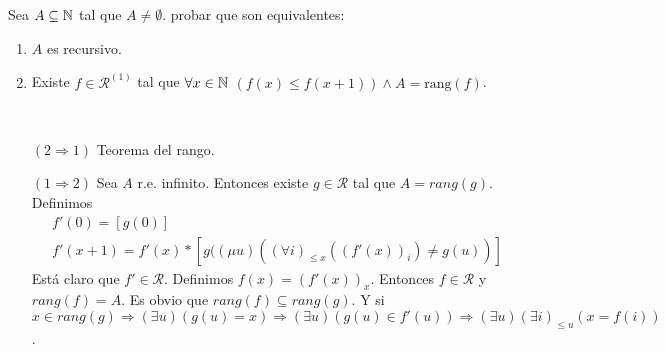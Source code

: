 \documentclass[twoside]{article}
\begin{document}
\begin{ejercicio}{6}
Sea $A \subseteq \mathbb{N}$ tal que $A \neq \emptyset$. probar que son equivalentes:
\begin{enumerate}
	\item $A$ es recursivo.
	\item Existe $f \in \mathcal{R}^{(1)}$ tal que $\forall x \in \mathbb{N}$ $(f(x) ≤ f(x+1)) \land A = \text{rang}(f)$.
\end{enumerate}
\end{ejercicio}
\begin{solucion}\
\begin{itemize}
\item[$(2\Rightarrow 1)$] Teorema del rango.
\item[$(1\Rightarrow 2)$] Sea $A$ r.e. infinito. Entonces existe $g\in\mathcal{R}$ tal que $A=rang(g)$. Definimos
\begin{align*}
&f'(0)=[g(0)]\\
&f'(x+1)=f'(x)*[g((\mu u)((\forall i)_{\leq x} ((f'(x))_i)\neq g(u))]
\end{align*}
Está claro que $f'\in\mathcal{R}$. Definimos $f(x)=(f'(x))_x$. Entonces $f\in\mathcal{R}$ y $rang(f)=A$. Es obvio que $rang(f)\subseteq rang(g)$. Y si $x\in rang(g)\Rightarrow(\exists u)(g(u)=x)\Rightarrow (\exists u)(g(u)\in f'(u))\Rightarrow (\exists u)(\exists i)_{\leq u} (x=f(i))$. 
\end{itemize}
\end{solucion}
\end{document}
